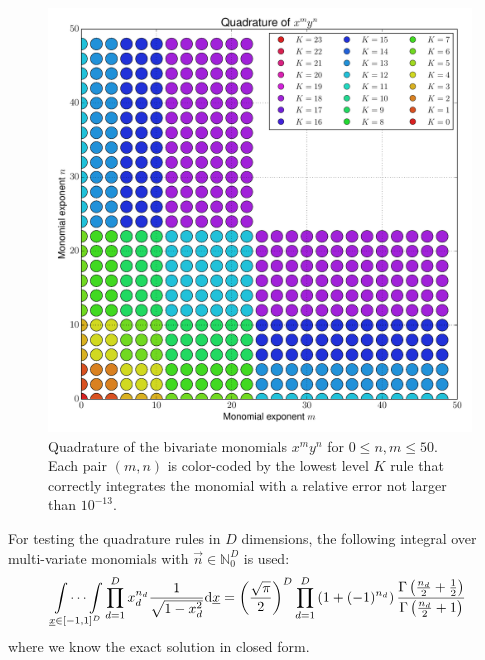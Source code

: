 \documentclass[a4paper,10pt]{article}
\begin{document}
\begin{figure}[h]
  \centering
  \includegraphics[width=\linewidth]{./img/monomial_errors_chebyshevt_2D.pdf}
  \caption{Quadrature of the bivariate monomials $x^m y^n$ for $0 \leq n, m \leq 50$.
  Each pair $(m,n)$ is color-coded by the lowest level $K$ rule that correctly
  integrates the monomial with a relative error not larger than $10^{-13}$.}
  \label{fig:monomial_errors_chebyshevt_2D}
\end{figure}

For testing the quadrature rules in $D$ dimensions, the following integral
over multi-variate monomials with $\vec{n} \in \mathbb{N}_0^D$ is used:
\begin{equation} \label{eq:chebyshevt_exact_solution}
  \idotsint \limits_{\underline{x} \in [-1,1]^D} \prod_{d=1}^D x_d^{n_d} \frac{1}{\sqrt{1-x_d^2}} \mathrm{d}\underline{x}
  =
  \left(\frac{\sqrt{\pi}}{2}\right)^D
  \prod_{d=1}^D \left(1 + (-1)^{n_d}\right)
  \frac{\Gamma\left(\frac{n_d}{2}+\frac{1}{2}\right)}
       {\Gamma\left(\frac{n_d}{2}+1\right)}
\end{equation}
where we know the exact solution in closed form.
\end{document}
